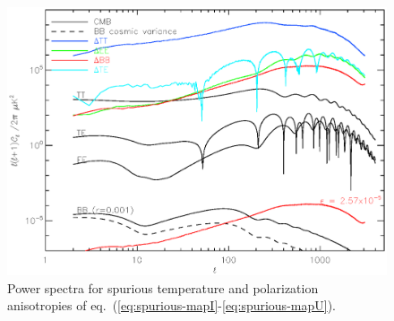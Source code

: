 {\begin{figure}[h]
\center
\includegraphics[scale=0.5]{Figures/cmb_power_spectra.eps}
\caption{Power spectra for spurious temperature and polarization anisotropies of
  eq.~(\ref{eq:spurious-mapI}-\ref{eq:spurious-mapU}). }
\label{fig:cl2}
\end{figure}





}

